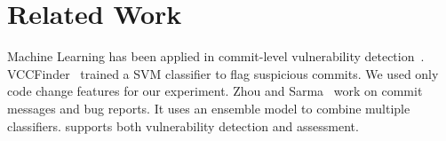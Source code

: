 \section{Related Work}






\vspace{3pt}
Machine Learning has been applied in commit-level vulnerability
detection~\cite{perl2015vccfinder,zhou2017automated,chen2019large}.
VCCFinder~\cite{perl2015vccfinder} trained a SVM classifier to flag
suspicious commits. We used only code change features for our
experiment. Zhou and Sarma~\cite{zhou2017automated} work on commit
messages and bug reports. It uses an ensemble model to combine
multiple classifiers.
{\tool} supports both vulnerability detection and
assessment.

